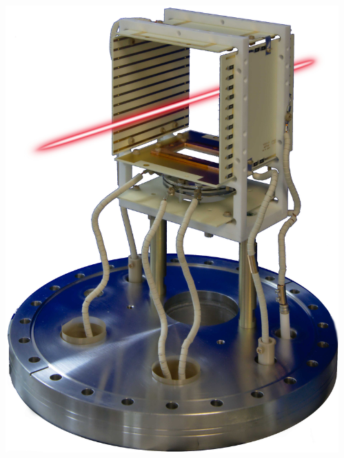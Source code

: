 \begin{frame}
\begin{columns}
\begin{column}{0.45\textwidth}
    \end{column}
    \begin{column}{0.45\textwidth}
      \includegraphics[width=\textwidth]{04_Test/fig/fig000_IPM_photo2}
    \end{column}
  \end{columns}
\end{frame}

